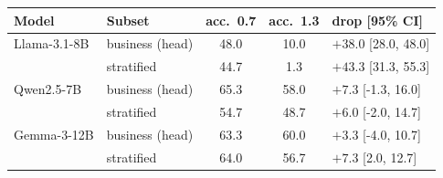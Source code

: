\begin{tabular}{llccl}
\toprule
Model & Subset & acc.\ 0.7 & acc.\ 1.3 & drop [95\% CI] \\
\midrule
Llama-3.1-8B & business (head) & 48.0 & 10.0 & $+38.0$ [28.0, 48.0] \\
 & stratified & 44.7 & 1.3 & $+43.3$ [31.3, 55.3] \\
Qwen2.5-7B & business (head) & 65.3 & 58.0 & $+7.3$ [-1.3, 16.0] \\
 & stratified & 54.7 & 48.7 & $+6.0$ [-2.0, 14.7] \\
Gemma-3-12B & business (head) & 63.3 & 60.0 & $+3.3$ [-4.0, 10.7] \\
 & stratified & 64.0 & 56.7 & $+7.3$ [2.0, 12.7] \\
\bottomrule
\end{tabular}
